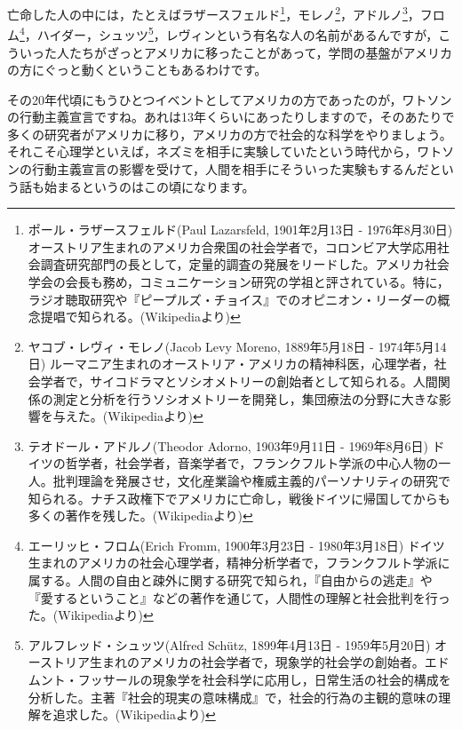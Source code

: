 \documentclass{ltjsbook}
\begin{document}
亡命した人の中には，たとえばラザースフェルド\footnote{ポール・ラザースフェルド(Paul Lazarsfeld, 1901年2月13日 - 1976年8月30日)  オーストリア生まれのアメリカ合衆国の社会学者で，コロンビア大学応用社会調査研究部門の長として，定量的調査の発展をリードした。アメリカ社会学会の会長も務め，コミュニケーション研究の学祖と評されている。特に，ラジオ聴取研究や『ピープルズ・チョイス』でのオピニオン・リーダーの概念提唱で知られる。(Wikipediaより)}，モレノ\footnote{ヤコブ・レヴィ・モレノ(Jacob Levy Moreno, 1889年5月18日 - 1974年5月14日)  ルーマニア生まれのオーストリア・アメリカの精神科医，心理学者，社会学者で，サイコドラマとソシオメトリーの創始者として知られる。人間関係の測定と分析を行うソシオメトリーを開発し，集団療法の分野に大きな影響を与えた。(Wikipediaより)}，アドルノ\footnote{テオドール・アドルノ(Theodor Adorno, 1903年9月11日 - 1969年8月6日)  ドイツの哲学者，社会学者，音楽学者で，フランクフルト学派の中心人物の一人。批判理論を発展させ，文化産業論や権威主義的パーソナリティの研究で知られる。ナチス政権下でアメリカに亡命し，戦後ドイツに帰国してからも多くの著作を残した。(Wikipediaより)}，フロム\footnote{エーリッヒ・フロム(Erich Fromm, 1900年3月23日 - 1980年3月18日)  ドイツ生まれのアメリカの社会心理学者，精神分析学者で，フランクフルト学派に属する。人間の自由と疎外に関する研究で知られ，『自由からの逃走』や『愛するということ』などの著作を通じて，人間性の理解と社会批判を行った。(Wikipediaより)}，ハイダー，シュッツ\footnote{アルフレッド・シュッツ(Alfred Schütz, 1899年4月13日 - 1959年5月20日)  オーストリア生まれのアメリカの社会学者で，現象学的社会学の創始者。エドムント・フッサールの現象学を社会科学に応用し，日常生活の社会的構成を分析した。主著『社会的現実の意味構成』で，社会的行為の主観的意味の理解を追求した。(Wikipediaより)}，レヴィンという有名な人の名前があるんですが，こういった人たちがざっとアメリカに移ったことがあって，学問の基盤がアメリカの方にぐっと動くということもあるわけです。

その20年代頃にもうひとつイベントとしてアメリカの方であったのが，ワトソンの行動主義宣言ですね。あれは13年くらいにあったりしますので，そのあたりで多くの研究者がアメリカに移り，アメリカの方で社会的な科学をやりましょう。それこそ心理学といえば，ネズミを相手に実験していたという時代から，ワトソンの行動主義宣言の影響を受けて，人間を相手にそういった実験もするんだという話も始まるというのはこの頃になります。
\end{document}
